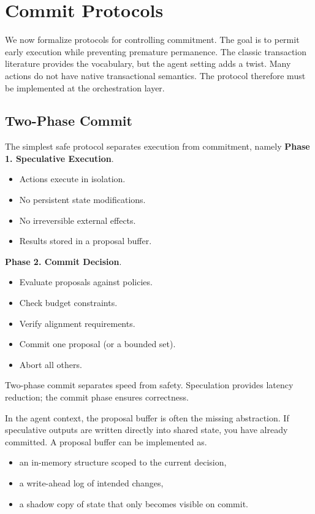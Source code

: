 \section{Commit Protocols}

We now formalize protocols for controlling commitment. The goal is to permit early execution while preventing premature permanence. The classic transaction literature provides the vocabulary, but the agent setting adds a twist. Many actions do not have native transactional semantics. The protocol therefore must be implemented at the orchestration layer.

\subsection{Two-Phase Commit}

The simplest safe protocol separates execution from commitment, namely \textbf{Phase 1. Speculative Execution}.
\begin{itemize}
\item Actions execute in isolation.
\item No persistent state modifications.
\item No irreversible external effects.
\item Results stored in a proposal buffer.
\end{itemize}

\textbf{Phase 2. Commit Decision}.
\begin{itemize}
\item Evaluate proposals against policies.
\item Check budget constraints.
\item Verify alignment requirements.
\item Commit one proposal (or a bounded set).
\item Abort all others.
\end{itemize}

Two-phase commit separates speed from safety. Speculation provides latency reduction; the commit phase ensures correctness.

In the agent context, the proposal buffer is often the missing abstraction. If speculative outputs are written directly into shared state, you have already committed. A proposal buffer can be implemented as.
\begin{itemize}
\item an in-memory structure scoped to the current decision,
\item a write-ahead log of intended changes,
\item a shadow copy of state that only becomes visible on commit.
\end{itemize}

